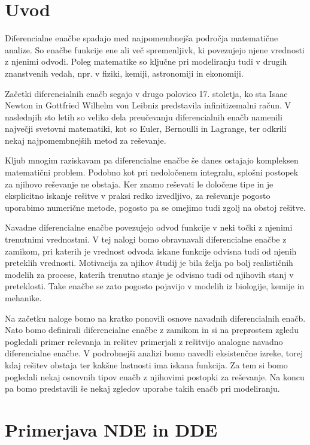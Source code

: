 \documentclass[12pt,a4paper]{amsart}
\theoremstyle{definition} %
\theoremstyle{plain} %
\begin{document}
\section{Uvod}

Diferencialne enačbe spadajo med najpomembnejša področja matematične analize. So enačbe funkcije ene ali več
spremenljivk, ki povezujejo njene vrednosti z njenimi odvodi. Poleg matematike so ključne pri modeliranju tudi v drugih
znanstvenih vedah, npr. v fiziki, kemiji, astronomiji in ekonomiji.

Začetki diferencialnih enačb segajo v drugo polovico 17. stoletja, ko sta Isaac Newton in Gottfried Wilhelm von 
Leibniz predstavila infinitizemalni račun. V naslednjih sto letih so veliko dela preučevanju diferencialnih
enačb namenili največji svetovni matematiki, kot so Euler, Bernoulli in Lagrange, ter odkrili nekaj najpomembnejših
metod za reševanje.

Kljub mnogim raziskavam pa diferencialne enačbe še danes ostajajo kompleksen matematični problem. Podobno kot pri
nedoločenem integralu, splošni postopek za njihovo reševanje ne obstaja. Ker znamo reševati le določene tipe in je
eksplicitno iskanje rešitve v praksi redko izvedljivo, za reševanje pogosto uporabimo numerične metode,
pogosto pa se omejimo tudi zgolj na obstoj rešitve.

Navadne diferencialne enačbe povezujejo odvod funkcije v neki točki z njenimi trenutnimi vrednostmi.
V tej nalogi bomo obravnavali diferencialne enačbe z zamikom, pri katerih je vrednost odvoda iskane funkcije odvisna
tudi od njenih preteklih vrednosti. Motivacija za njihov študij je bila želja po bolj realističnih modelih za procese, 
katerih trenutno stanje je odvisno tudi od njihovih stanj v preteklosti. Take enačbe se zato pogosto pojavijo v modelih
iz biologije, kemije in mehanike.

Na začetku naloge bomo na kratko ponovili osnove navadnih diferencialnih enačb. Nato bomo definirali
diferencialne enačbe z zamikom in si na preprostem zgledu pogledali primer reševanja in rešitev primerjali z 
rešitvijo analogne navadno diferencialne enačbe. V podrobnejši analizi bomo navedli eksistenčne izreke, torej kdaj 
rešitev obstaja ter kakšne lastnosti ima iskana funkcija. Za tem si bomo pogledali nekaj osnovnih tipov enačb z 
njihovimi postopki za reševanje. Na koncu pa bomo predstavili še nekaj zgledov uporabe takih enačb pri modeliranju.


\section{Primerjava NDE in DDE}
\end{document}
